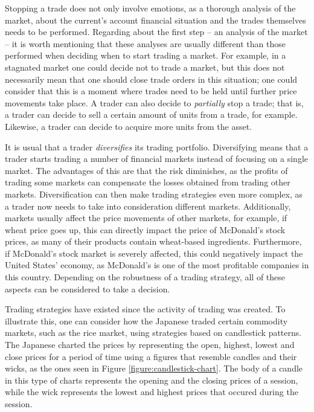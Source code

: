 Stopping a trade does not only involve emotions, as a thorough analysis of the
market, about the current's account financial situation and the trades
themselves needs to be performed. Regarding about the first step -- an analysis
of the market -- it is worth mentioning that these analyses are usually
different than those performed when deciding when to start trading a market. For
example, in a stagnated market one could decide not to trade a market, but this
does not necessarily mean that one should close trade orders in this situation;
one could consider that this is a moment where trades need to be held until
further price movements take place. A trader can also decide to
\textit{partially} stop a trade; that is, a trader can decide to sell a certain
amount of units from a trade, for example. Likewise, a trader can decide to
acquire more units from the asset.

It is usual that a trader \textit{diversifies} its trading
portfolio. Diversifying means that a trader starts trading a number of financial
markets instead of focusing on a single market. The advantages
of this %
are that the risk diminishes, as the profits of trading some markets can
compensate the losses obtained from trading other markets. Diversification can
then make trading strategies even more complex, as a trader now needs to take
into consideration different markets. Additionally, markets usually affect the
price movements of other markets, for example, if wheat price goes up, this can
directly impact the price of McDonald's stock prices, as many of their products
contain wheat-based ingredients. Furthermore, if McDonald's stock market is
severely affected, this could negatively impact the United States' economy, as
McDonald's is one of the most profitable companies in this country. Depending on
the robustness of a trading strategy, all of these aspects can be considered to
take a decision.


Trading strategies have existed since the activity of trading was created.
To illustrate this, one can consider how the Japanese traded certain commodity
markets, such as the rice market, using strategies based on
candlestick patterns. %
The Japanese charted the prices by representing the open, highest, lowest and
close prices for a period of time using a figures that resemble candles and
their wicks, as the ones seen in Figure \ref{figure:candlestick-chart}. The body
of a candle in this type of charts represents the opening and the closing prices
of a session, while the wick represents the lowest and highest prices that
occured during the session.



